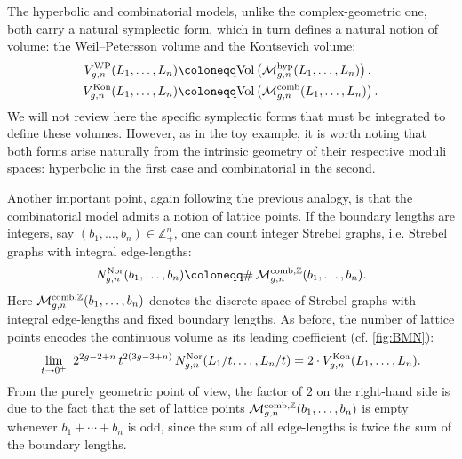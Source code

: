 \documentclass[a4paper,11pt,english]{article}
\theoremstyle{plain}
\theoremstyle{definition}
\theoremstyle{plain}
\newcommand{\Z}{\mathbb{Z}}
\newcommand{\M}{\mathcal{M}}
\begin{document}
The hyperbolic and combinatorial models, unlike the complex-geometric one, both carry a natural symplectic form, which in turn defines a natural notion of volume: the Weil--Petersson volume and the Kontsevich volume:
\begin{equation}
\begin{aligned}
    V^{\textup{WP}}_{g,n}(L_1,\ldots,L_n)
    &\coloneqq
    \mathrm{Vol}\left(
        \M_{g,n}^{\textup{hyp}}(L_1,\ldots,L_n)
    \right), \\
    V^{\textup{Kon}}_{g,n}(L_1,\ldots,L_n)
    &\coloneqq
    \mathrm{Vol}\left(
        \M_{g,n}^{\textup{comb}}(L_1,\ldots,L_n)
    \right).
\end{aligned}
\end{equation}
We will not review here the specific symplectic forms that must be integrated to define these volumes. However, as in the toy example, it is worth noting that both forms arise naturally from the intrinsic geometry of their respective moduli spaces: hyperbolic in the first case and combinatorial in the second.

Another important point, again following the previous analogy, is that the combinatorial model admits a notion of lattice points. If the boundary lengths are integers, say $(b_1,\ldots,b_n) \in \Z_+^n$, one can count integer Strebel graphs, i.e. Strebel graphs with integral edge-lengths:
\begin{equation}
    N^{\textup{Nor}}_{g,n}(b_1,\ldots,b_n)
    \coloneqq
    \#\,\M_{g,n}^{\textup{comb},\Z}(b_1,\ldots,b_n).
\end{equation}
Here $\M_{g,n}^{\textup{comb},\Z}(b_1,\ldots,b_n)$ denotes the discrete space of Strebel graphs with integral edge-lengths and fixed boundary lengths. As before, the number of lattice points encodes the continuous volume as its leading coefficient (cf. \cref{fig:BMN}):
\begin{equation}
    \lim_{t \to 0^+} \
        2^{2g-2+n} \,
        t^{2(3g-3+n)} \,
        N^{\textup{Nor}}_{g,n}(L_1/t,\ldots,L_n/t)
    =
    2 \cdot V^{\textup{Kon}}_{g,n}(L_1,\ldots,L_n).
\end{equation}
From the purely geometric point of view, the factor of $2$ on the right-hand side is due to the fact that the set of lattice points $\M_{g,n}^{\textup{comb},\Z}(b_1,\ldots,b_n)$ is empty whenever $b_1 + \cdots + b_n$ is odd, since the sum of all edge-lengths is twice the sum of the boundary lengths.
\end{document}
